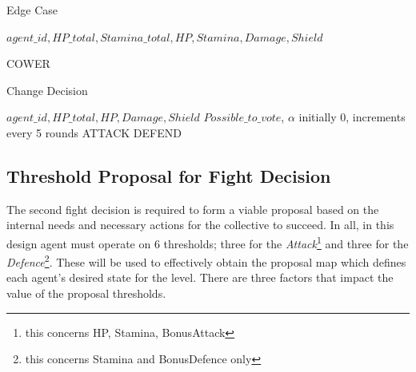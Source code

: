 \begin{algorithm}
\caption{Edge Case}\label{alg:9}
\begin{algorithmic} 
\scriptsize
\Require $agent\_id, HP\_total,Stamina\_total, HP, Stamina, Damage, Shield$

\Return COWER
\EndIf
\end{algorithmic}
\end{algorithm}



\begin{algorithm}
\caption{Change Decision}\label{alg:10}
\begin{algorithmic} 
\scriptsize
\Require $agent\_id, HP\_total, HP, Damage, Shield$
\Ensure $Possible\_to\_vote$, $\alpha$ initially 0, increments every 5 rounds
\Return ATTACK
\Return DEFEND
\EndIf
\EndIf
\EndIf
\end{algorithmic}
\end{algorithm}

\pagebreak

\subsection{Threshold Proposal for Fight Decision}
    
    The second fight decision is required to form a viable proposal based on the internal needs and necessary actions for the collective to succeed. In all, in this design agent must operate on 6 thresholds; three for the \textit{Attack}\footnote{this concerns HP, Stamina, BonusAttack} and three for the \textit{Defence}\footnote{this concerns Stamina and BonusDefence only}. These will be used to effectively obtain the proposal map which defines each agent's desired state for the level. There are three factors that impact the value of the proposal thresholds.
    
